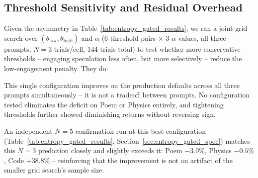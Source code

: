 \documentclass[10pt,journal,compsoc,twocolumn]{IEEEtran}
\begin{document}
\subsection{Threshold Sensitivity and Residual Overhead}
\label{sec:threshold_sweep}
Given the asymmetry in Table~\ref{tab:entropy_gated_results}, we ran a joint grid search over $(\theta_{\text{low}}, \theta_{\text{high}})$ and $\alpha$ (6 threshold pairs $\times$ 3 $\alpha$ values, all three prompts, $N{=}3$ trials/cell, 144 trials total) to test whether more conservative thresholds -- engaging speculation less often, but more selectively -- reduce the low-engagement penalty. They do:
\begin{table}[t]
\caption{Best configuration found vs. production defaults, RTX 5090 Blackwell.}
\label{tab:threshold_sweep}
\centering
{}
\end{table}
This single configuration improves on the production defaults across all three prompts simultaneously -- it is not a tradeoff between prompts. No configuration tested eliminates the deficit on Poem or Physics entirely, and tightening thresholds further showed diminishing returns without reversing sign.

An independent $N{=}5$ confirmation run at this best configuration (Table~\ref{tab:entropy_gated_results}, Section~\ref{sec:entropy_gated_spec}) matches this $N{=}3$ prediction closely and slightly exceeds it: Poem $-3.0\%$, Physics $-0.5\%$, Code $+38.8\%$ -- reinforcing that the improvement is not an artifact of the smaller grid search's sample size.
\end{document}
